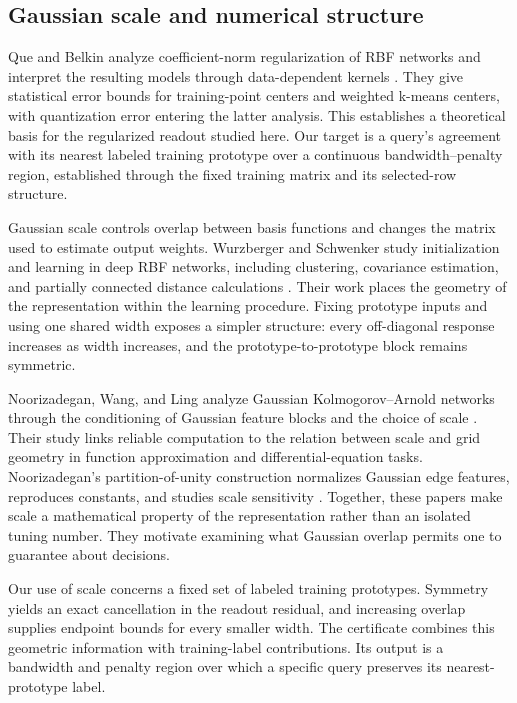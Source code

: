 \documentclass[preprint,12pt]{elsarticle}
\begin{document}
\subsection{Gaussian scale and numerical structure}
Que and Belkin analyze coefficient-norm regularization of RBF networks and interpret the resulting models through data-dependent kernels \citep{que2016}. They give statistical error bounds for training-point centers and weighted k-means centers, with quantization error entering the latter analysis. This establishes a theoretical basis for the regularized readout studied here. Our target is a query's agreement with its nearest labeled training prototype over a continuous bandwidth--penalty region, established through the fixed training matrix and its selected-row structure.

Gaussian scale controls overlap between basis functions and changes the matrix used to estimate output weights. Wurzberger and Schwenker study initialization and learning in deep RBF networks, including clustering, covariance estimation, and partially connected distance calculations \citep{wurzberger2024}. Their work places the geometry of the representation within the learning procedure. Fixing prototype inputs and using one shared width exposes a simpler structure: every off-diagonal response increases as width increases, and the prototype-to-prototype block remains symmetric.

Noorizadegan, Wang, and Ling analyze Gaussian Kolmogorov--Arnold networks through the conditioning of Gaussian feature blocks and the choice of scale \citep{noorizadegan2026reliable}. Their study links reliable computation to the relation between scale and grid geometry in function approximation and differential-equation tasks. Noorizadegan's partition-of-unity construction normalizes Gaussian edge features, reproduces constants, and studies scale sensitivity \citep{noorizadegan2026partition}. Together, these papers make scale a mathematical property of the representation rather than an isolated tuning number. They motivate examining what Gaussian overlap permits one to guarantee about decisions.

Our use of scale concerns a fixed set of labeled training prototypes. Symmetry yields an exact cancellation in the readout residual, and increasing overlap supplies endpoint bounds for every smaller width. The certificate combines this geometric information with training-label contributions. Its output is a bandwidth and penalty region over which a specific query preserves its nearest-prototype label.
\end{document}
